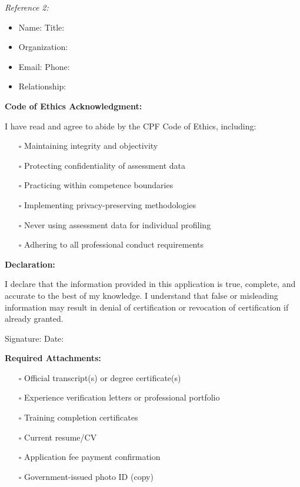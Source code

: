 \documentclass[11pt,a4paper]{article}
\begin{document}
\textit{Reference 2:}
\begin{itemize}
\item Name: \underline{\hspace{8cm}} Title: \underline{\hspace{5cm}}
\item Organization: \underline{\hspace{10cm}}
\item Email: \underline{\hspace{8cm}} Phone: \underline{\hspace{5cm}}
\item Relationship: \underline{\hspace{10cm}}
\end{itemize}

\textbf{Code of Ethics Acknowledgment:}

I have read and agree to abide by the CPF Code of Ethics, including:
\begin{itemize}
\item[$\square$] Maintaining integrity and objectivity
\item[$\square$] Protecting confidentiality of assessment data
\item[$\square$] Practicing within competence boundaries
\item[$\square$] Implementing privacy-preserving methodologies
\item[$\square$] Never using assessment data for individual profiling
\item[$\square$] Adhering to all professional conduct requirements
\end{itemize}

\textbf{Declaration:}

I declare that the information provided in this application is true, complete, and accurate to the best of my knowledge. I understand that false or misleading information may result in denial of certification or revocation of certification if already granted.

Signature: \underline{\hspace{8cm}} Date: \underline{\hspace{4cm}}

\textbf{Required Attachments:}
\begin{itemize}
\item[$\square$] Official transcript(s) or degree certificate(s)
\item[$\square$] Experience verification letters or professional portfolio
\item[$\square$] Training completion certificates
\item[$\square$] Current resume/CV
\item[$\square$] Application fee payment confirmation
\item[$\square$] Government-issued photo ID (copy)
\end{itemize}
\end{document}
